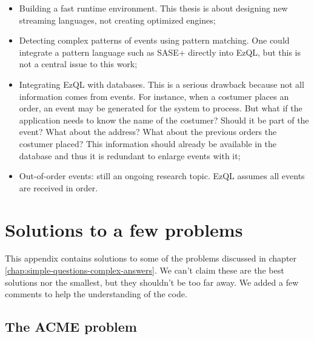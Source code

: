 \documentclass[a4,11pt]{report}
\begin{document}
\begin{itemize}
\item Building a fast runtime environment. This thesis is about
  designing new streaming languages, not creating optimized engines;
\item Detecting complex patterns of events using pattern matching. One
  could integrate a pattern language such as SASE+ \cite{SASE+}
  directly into EzQL, but this is not a central issue to this work;
\item Integrating EzQL with databases. This is a serious drawback
  because not all information comes from events. For instance, when a
  costumer places an order, an event may be generated for the system
  to process. But what if the application needs to know the name of
  the costumer? Should it be part of the event? What about the
  address? What about the previous orders the costumer placed?  This
  information should already be available in the database and thus it
  is redundant to enlarge events with it;
\item Out-of-order events: still an ongoing research topic. EzQL
  assumes all events are received in order.
\end{itemize}





\appendix
\chapter{Solutions to a few problems}

This appendix contains solutions to some of the problems discussed in
chapter \ref{chap:simple-questions-complex-answers}. We can't claim
these are the best solutions nor the smallest, but they shouldn't be
too far away. We added a few comments to help the understanding of the
code.

\section{The ACME problem}
\label{sec:acme-problem-solution}

\lstset{
  language=CCL,
  columns=fullflexible,
  basicstyle=\tt,
  keywordstyle=[1]\bf,
  keywordstyle=[2]\it,
}
\end{document}
